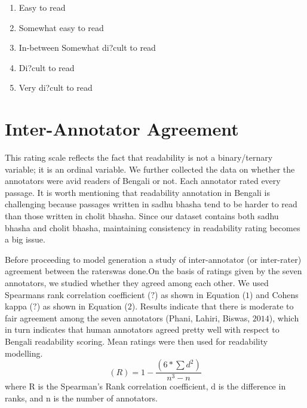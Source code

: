\documentclass[a4paper,12pt]{book}
\begin{document}
 \begin{enumerate}
 	 \item Easy to read \item Somewhat easy to read \item In-between Somewhat di?cult to read \item Di?cult to read \item Very di?cult to read
 	
\end{enumerate}
\section{Inter-Annotator Agreement}
This rating scale reflects the fact that readability is not a binary/ternary
variable; it is an ordinal variable. We further collected the data on whether
the annotators were avid readers of Bengali or not. Each annotator rated
every passage. It is worth mentioning that readability annotation in Bengali
is challenging because passages written in sadhu bhasha tend to be harder
to read than those written in cholit bhasha. Since our dataset contains both
sadhu bhasha and cholit bhasha, maintaining consistency in readability
rating becomes a big issue.

Before proceeding to model generation a study of inter-annotator (or inter-rater)
agreement between the raterswas done.On the basis of ratings given by the seven
annotators, we studied whether they agreed among each other. We used
Spearmans rank correlation coefficient ($?$) as shown in Equation ($1$) and
Cohens kappa ($?$) as shown in Equation ($2$). Results indicate that there is
moderate to fair agreement among the seven annotators (Phani, Lahiri, 
Biswas, $2014$), which in turn indicates that human annotators agreed pretty
well with respect to Bengali readability scoring. Mean ratings were then used
for readability modelling.
$$(R)=1-\frac{(6*\sum{d^2})}{n^3-n}$$
where
R is the Spearman's Rank correlation coefficient,
d is the difference in ranks, and
n is the number of annotators.
\end{document}
